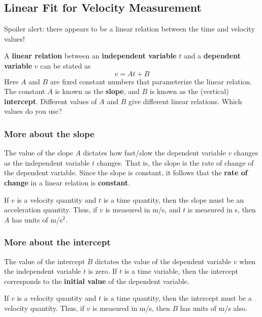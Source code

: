 \subsection{Linear Fit for Velocity Measurement}
Spoiler alert: there appears to be a linear relation between the time and velocity values!

A \textbf{linear relation} between an \textbf{independent variable} $t$ and a \textbf{dependent variable} $v$ can be stated as
\begin{equation}
    v = A t + B
\end{equation}
Here $A$ and $B$ are fixed constant numbers that parameterize the linear relation. The constant $A$ is known as the \textbf{slope}, and $B$ is known as the (vertical) \textbf{intercept}. Different values of $A$ and $B$ give different linear relations. Which values do you use?
\subsubsection{More about the slope}
The value of the slope $A$ dictates how fast/slow the dependent variable $v$ changes as the independent variable $t$ changes. That is, the slope is the rate of change of the dependent variable. Since the slope is constant, it follows that the \textbf{rate of change} in a linear relation is \textbf{constant}.

If $v$ is a velocity quantity and $t$ is a time quantity, then the slope must be an acceleration quantity. Thus, if $v$ is measured in m/s, and $t$ is measured in s, then $A$ has units of m/s$^{2}$.
\subsubsection{More about the intercept}
The value of the intercept $B$ dictates the value of the dependent variable $v$ when the independent variable $t$ is zero. If $t$ is a time variable, then the intercept corresponds to the \textbf{initial value} of the dependent variable.

If $v$ is a velocity quantity and $t$ is a time quantity, then the intercept must be a velocity quantity. Thus, if $v$ is measured in m/s, then $B$ has units of m/s also.
